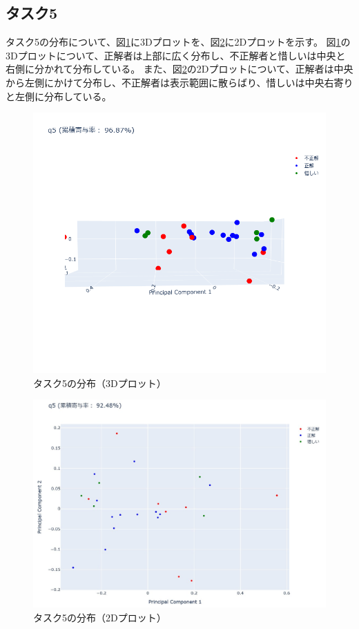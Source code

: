 \documentclass[paper=a4paper,fontsize=11pt]{jlreq}
\begin{document}
    \subsection{タスク5}
      タスク5の分布について、図\ref{3dplot_q5}に3Dプロットを、図\ref{2dplot_q5}に2Dプロットを示す。
      図\ref{3dplot_q5}の3Dプロットについて、正解者は上部に広く分布し、不正解者と惜しいは中央と右側に分かれて分布している。
      また、図\ref{2dplot_q5}の2Dプロットについて、正解者は中央から左側にかけて分布し、不正解者は表示範囲に散らばり、惜しいは中央右寄りと左側に分布している。
      \begin{figure}[htbp]
        \centering
        \includegraphics[width=0.8\linewidth]{3dplot_q5.png}
        \caption{タスク5の分布（3Dプロット）}
        \label{3dplot_q5}
      \end{figure}
      \FloatBarrier
      \begin{figure}[htbp]
        \centering
        \includegraphics[width=\linewidth]{2dplot_q5.jpg}
        \caption{タスク5の分布（2Dプロット）}
        \label{2dplot_q5}
      \end{figure}
      \FloatBarrier
      \pagebreak
\end{document}
